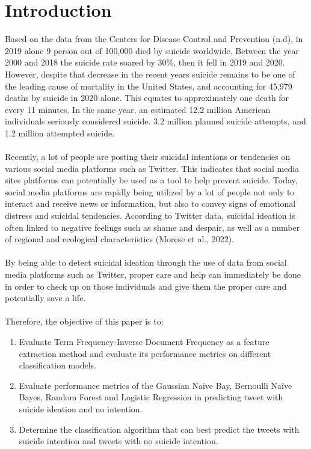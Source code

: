 \documentclass[runningheads]{llncs}
\begin{document}
\section{Introduction}
Based on the data from the Centers for Disease Control and Prevention (n.d), in 2019 alone 9 person out of 100,000 died by suicide worldwide. Between the year 2000 and 2018 the suicide rate soared by 30\%, then it fell in 2019 and 2020. However, despite that decrease in the recent years suicide remains to be one of the leading cause of mortality in the United States, and accounting for 45,979 deaths by suicide in 2020 alone. This equates to approximately one death for every 11 minutes. In the same year,  an estimated 12.2 million American individuals seriously considered suicide. 3.2 million planned suicide attempts, and 1.2 million attempted suicide. 
\paragraph{}
Recently, a lot of people are posting their suicidal intentions or tendencies on various social media platforms such as Twitter. This indicates that social media sites platforms can potentially be used as a tool to help prevent suicide. Today, social media platforms are rapidly being utilized by a lot of people not only to interact and receive news or information, but also to convey signs of emotional distress and suicidal tendencies. According to Twitter data, suicidal ideation is often linked to negative feelings such as shame and despair, as well as a number of regional and ecological characteristics (Morese et al., 2022).
\paragraph{}
By being able to detect suicidal ideation through the use of data from social media platforms such as Twitter, proper care and help can immediately be done in order to check up on those individuals and give them the proper care and potentially save a life.
\paragraph{}
Therefore, the objective of this paper is to:
\begin{enumerate}
\setlength{\itemindent}{.5in}
  \item Evaluate Term Frequency-Inverse Document Frequency as a feature extraction method and evaluate its performance metrics on different classification models.
  \item Evaluate performance metrics of the Gaussian Naïve Bay, Bernoulli Naïve Bayes, Random Forest and Logistic Regression in predicting tweet with suicide ideation and no intention.
  \item Determine the classification algorithm that can best predict the tweets with suicide intention and tweets with no suicide intention.
\end{enumerate}
\end{document}
